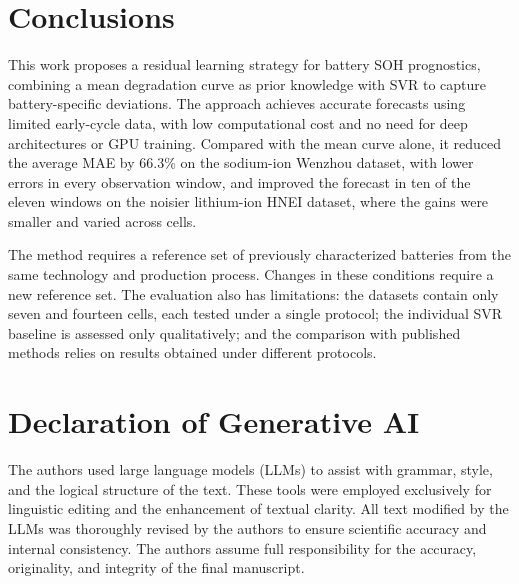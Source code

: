 \documentclass[conference]{IEEEtran}
\begin{document}
\section{Conclusions}
\label{sec:conclusoes}

This work proposes a residual learning strategy for battery SOH prognostics, combining a mean degradation curve as prior knowledge with SVR to capture battery-specific deviations. The approach achieves accurate forecasts using limited early-cycle data, with low computational cost and no need for deep architectures or GPU training. Compared with the mean curve alone, it reduced the average MAE by 66.3\% on the sodium-ion Wenzhou dataset, with lower errors in every observation window, and improved the forecast in ten of the eleven windows on the noisier lithium-ion HNEI dataset, where the gains were smaller and varied across cells.


The method requires a reference set of previously characterized batteries from the same technology and production process. Changes in these conditions require a new reference set. The evaluation also has limitations: the datasets contain only seven and fourteen cells, each tested under a single protocol; the individual SVR baseline is assessed only qualitatively; and the comparison with published methods relies on results obtained under different protocols.

\section*{Declaration of Generative AI} 
The authors used large language models (LLMs) to assist with grammar, style, and the logical structure of the text. These tools were employed exclusively for linguistic editing and the enhancement of textual clarity. All text modified by the LLMs was thoroughly revised by the authors to ensure scientific accuracy and internal consistency. The authors assume full responsibility for the accuracy, originality, and integrity of the final manuscript.







\end{document}

